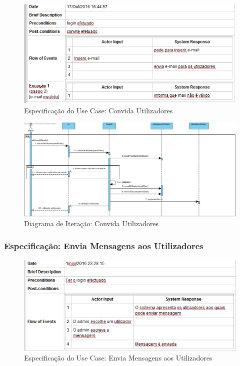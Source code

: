 \begin{figure}[htb!]
	\centering
	\includegraphics[scale=0.7]{imagens/Especificacoes/convidautilizadores}  
	\caption{Especificação do Use Case: Convida Utilizadores}  
\end{figure}

\begin{figure}[htb!]
	\centering
	\includegraphics[scale=0.46]{imagens/diagramaIt/AdicionarUtilizadorGrupo}  
	\caption{Diagrama de Iteração: Convida Utilizadores }  
\end{figure}





\newpage

\subsubsection{Especificação: Envia Mensagens aos Utilizadores }

\begin{figure}[htb!]
	\centering
	\includegraphics[scale=0.7]{imagens/Especificacoes/enviasmsutilizadores}  
	\caption{Especificação do Use Case: Envia Mensagens aos Utilizadores}  
\end{figure}



